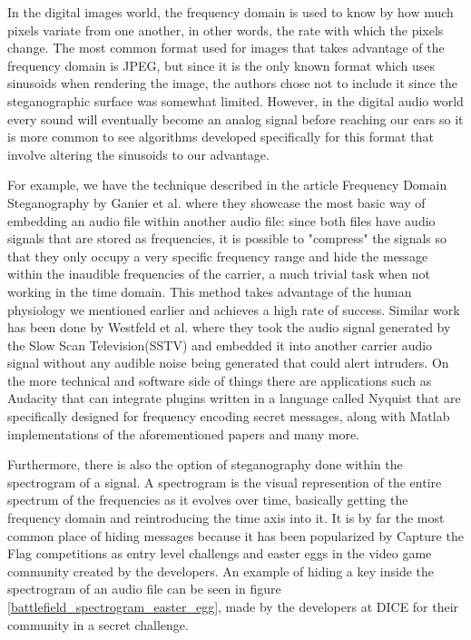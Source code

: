 In the digital images world, the frequency domain is used to know by how much pixels variate from one another, in other words, the rate with which the pixels change. The most common format used for images that takes advantage of the frequency domain is JPEG, but since it is the only known format which uses sinusoids when rendering the image, the authors chose not to include it since the steganographic surface was somewhat limited. However, in the digital audio world every sound will eventually become an analog signal before reaching our ears so it is more common to see algorithms developed specifically for this format that involve altering the sinusoids to our advantage.

For example, we have the technique described in the article Frequency Domain Steganography by Ganier et al.\cite{ganier_hollman_rosser_swanson} where they showcase the most basic way of embedding an audio file within another audio file: since both files have audio signals that are stored as frequencies, it is possible to "compress" the signals so that they only occupy a very specific frequency range and hide the message within the inaudible frequencies of the carrier, a much trivial task when not working in the time domain. This method takes advantage of the human physiology we mentioned earlier and achieves a high rate of success. Similar work has been done by Westfeld et al. \cite{dsss_sstv} where they took the audio signal generated by the Slow Scan Television(SSTV) and embedded it into another carrier audio signal without any audible noise being generated that could alert intruders. On the more technical and software side of things there are applications such as Audacity that can integrate plugins written in a language called Nyquist that are specifically designed for frequency encoding secret messages, along with Matlab implementations of the aforementioned papers and many more.

Furthermore, there is also the option of steganography done within the spectrogram of a signal. A spectrogram is the visual represention of the entire spectrum of the frequencies as it evolves over time, basically getting the frequency domain and reintroducing the time axis into it. It is by far the most common place of hiding messages because it has been popularized by Capture the Flag competitions as entry level challengs and easter eggs in the video game community created by the developers. An example of hiding a key inside the spectrogram of an audio file can be seen in figure \ref{battlefield_spectrogram_easter_egg}, made by the developers at DICE for their community in a secret challenge\cite{battlefield_wiki}.


